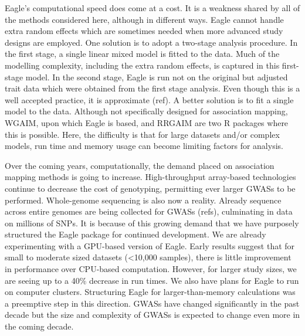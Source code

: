 \documentclass{article}
\begin{document}
Eagle's computational speed does come at a cost. It is a weakness shared by all of the methods considered here, although in different ways. 
Eagle cannot handle extra random effects which are sometimes needed when more advanced study designs are employed. One solution 
is to adopt a two-stage analysis procedure. In the first stage, a single linear mixed model is fitted to the data. Much of the modelling complexity, 
including the extra random effects, is 
captured in this first-stage model. In the second stage, Eagle is run not on the original but adjusted trait data which were obtained from the first stage analysis. Even though this is a well accepted practice, it is approximate (ref).  A better solution is to fit a single model to the data. 
Although not specifically designed for association mapping,
WGAIM, upon which Eagle is based, and RRGAIM are two R packages where this is possible. Here, the difficulty is that for large datasets and/or complex 
models,  run time and memory usage can become limiting factors for analysis. 


Over the coming years, computationally, the demand placed on association mapping methods is going to increase. 
High-throughput array-based technologies continue to decrease the cost of genotyping, permitting ever larger GWASs to be performed. 
Whole-genome sequencing is also now a reality. Already sequence across entire genomes are being collected for GWASs (refs), 
culminating in data on millions of SNPs. It is because of this growing demand that 
we have purposely structured the Eagle package for continued development. We are already experimenting with a GPU-based version of Eagle. 
Early results suggest that for small to moderate sized datasets (<10,000 samples), there is little improvement in performance over CPU-based 
computation.  However, for larger study sizes, we are seeing up to a 40\% decrease in run times.  
We also have plans for Eagle to run on computer clusters. Structuring Eagle for larger-than-memory calculations was a 
preemptive step in this direction. GWASs have changed significantly in the past decade but the size and complexity of GWASs is expected 
to change even more in the coming decade. 























\end{document}
